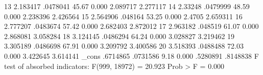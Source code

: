          13  {\VBAR}   2.183417   .0478041    45.67   0.000     2.089717    2.277117
         14  {\VBAR}    2.33248   .0479999    48.59   0.000     2.238396    2.426564
         15  {\VBAR}   2.564906    .048164    53.25   0.000       2.4705    2.659311
         16  {\VBAR}   2.777207   .0483674    57.42   0.000     2.682403    2.872012
         17  {\VBAR}   2.963182    .048519    61.07   0.000     2.868081    3.058284
         18  {\VBAR}   3.124145   .0486294    64.24   0.000     3.028827    3.219462
         19  {\VBAR}   3.305189   .0486698    67.91   0.000     3.209792    3.400586
         20  {\VBAR}   3.518393   .0488488    72.03   0.000     3.422645    3.614141
             {\VBAR}
       _cons {\VBAR}   .6714865   .0731586     9.18   0.000     .5280891    .8148838
F test of absorbed indicators: F(999, 18972) = 20.923         Prob > F = 0.000
{\smallskip}
